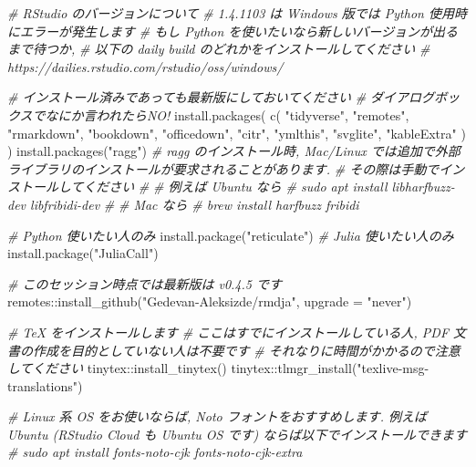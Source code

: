\documentclass[
]{ltjsarticle}
\newenvironment{Shaded}{\begin{snugshade}}{\end{snugshade}}
\newcommand{\AttributeTok}[1]{\textcolor[rgb]{0.77,0.63,0.00}{#1}}
\newcommand{\CommentTok}[1]{\textcolor[rgb]{0.56,0.35,0.01}{\textit{#1}}}
\newcommand{\FunctionTok}[1]{\textcolor[rgb]{0.00,0.00,0.00}{#1}}
\newcommand{\NormalTok}[1]{#1}
\newcommand{\SpecialCharTok}[1]{\textcolor[rgb]{0.00,0.00,0.00}{#1}}
\newcommand{\StringTok}[1]{\textcolor[rgb]{0.31,0.60,0.02}{#1}}
\begin{document}
\begin{Shaded}
\begin{Highlighting}[numbers=left,,]
\CommentTok{\# RStudio のバージョンについて}
\CommentTok{\# 1.4.1103 は Windows 版では Python 使用時にエラーが発生します}
\CommentTok{\# もし Python を使いたいなら新しいバージョンが出るまで待つか,}
\CommentTok{\# 以下の daily build のどれかをインストールしてください}
\CommentTok{\# https://dailies.rstudio.com/rstudio/oss/windows/}

\CommentTok{\# インストール済みであっても最新版にしておいてください}
\CommentTok{\# ダイアログボックスでなにか言われたらNO!}
\FunctionTok{install.packages}\NormalTok{(}
  \FunctionTok{c}\NormalTok{(}
    \StringTok{"tidyverse"}\NormalTok{,}
    \StringTok{"remotes"}\NormalTok{,}
    \StringTok{"rmarkdown"}\NormalTok{,}
    \StringTok{"bookdown"}\NormalTok{,}
    \StringTok{"officedown"}\NormalTok{,}
    \StringTok{"citr"}\NormalTok{,}
    \StringTok{"ymlthis"}\NormalTok{,}
    \StringTok{"svglite"}\NormalTok{,}
    \StringTok{"kableExtra"}
\NormalTok{  )}
\NormalTok{)}
\FunctionTok{install.packages}\NormalTok{(}\StringTok{"ragg"}\NormalTok{)}
\CommentTok{\# ragg のインストール時, Mac/Linux では追加で外部ライブラリのインストールが要求されることがあります.}
\CommentTok{\# その際は手動でインストールしてください}
\CommentTok{\#}
\CommentTok{\# 例えば Ubuntu なら}
\CommentTok{\# sudo apt install libharfbuzz{-}dev libfribidi{-}dev}
\CommentTok{\#}
\CommentTok{\# Mac なら}
\CommentTok{\# brew install harfbuzz fribidi}

\CommentTok{\# Python 使いたい人のみ}
\FunctionTok{install.package}\NormalTok{(}\StringTok{"reticulate"}\NormalTok{)}
\CommentTok{\# Julia 使いたい人のみ}
\FunctionTok{install.package}\NormalTok{(}\StringTok{"JuliaCall"}\NormalTok{)}

\CommentTok{\# このセッション時点では最新版は v0.4.5 です}
\NormalTok{remotes}\SpecialCharTok{::}\FunctionTok{install\_github}\NormalTok{(}\StringTok{"Gedevan{-}Aleksizde/rmdja"}\NormalTok{, }\AttributeTok{upgrade =} \StringTok{"never"}\NormalTok{)}

\CommentTok{\# TeX をインストールします}
\CommentTok{\# ここはすでにインストールしている人, PDF 文書の作成を目的としていない人は不要です}
\CommentTok{\# それなりに時間がかかるので注意してください}
\NormalTok{tinytex}\SpecialCharTok{::}\FunctionTok{install\_tinytex}\NormalTok{()}
\NormalTok{tinytex}\SpecialCharTok{::}\FunctionTok{tlmgr\_install}\NormalTok{(}\StringTok{"texlive{-}msg{-}translations"}\NormalTok{)}

\CommentTok{\# Linux 系 OS をお使いならば, Noto フォントをおすすめします. 例えば Ubuntu (RStudio Cloud も Ubuntu OS です) ならば以下でインストールできます}
\CommentTok{\# sudo apt install fonts{-}noto{-}cjk fonts{-}noto{-}cjk{-}extra}



\end{Highlighting}
\end{Shaded}
\end{document}
